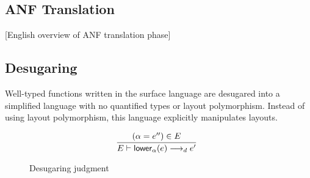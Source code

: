 \subsection{ANF Translation}

[English overview of ANF translation phase]

\subsection{Desugaring}

Well-typed functions written in the surface language
are desugared into a simplified language with no quantified types or layout polymorphism. Instead of using layout polymorphism, this language explicitly manipulates layouts.


\begin{figure}
  \[
    \labinfer{E \vdash \apply_\alpha(e) \desugars e'}{(\alpha = e'') \in E}
  \]
  \caption{Desugaring judgment}
  \label{fig:desugaring}
\end{figure}

